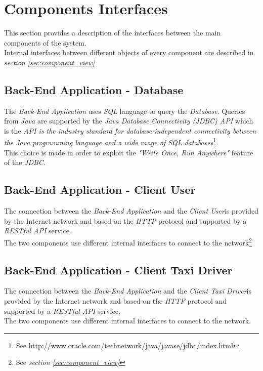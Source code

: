 \section{Components Interfaces} %
\label{sec:components_interfaces}
This section provides a description of the interfaces between the main components of the system.\\
Internal interfaces between different objects of every component are described in \emph{section \ref{sec:component_view}}
\subsection{Back-End Application - Database} %
\label{sub:back_end_application_database}
The \emph{Back-End Application} uses \emph{SQL} language to query the \emph{Database}. Queries from \emph{Java} are supported by the \emph{Java Database Connectivity (JDBC) API} which is the \emph{API is the industry standard for database-independent connectivity between the Java programming language and a wide range of SQL databases}\footnote{See \url{http://www.oracle.com/technetwork/java/javase/jdbc/index.html}}.\\
This choice is made in order to exploit the \emph{"Write Once, Run Anywhere"} feature of the \emph{JDBC}.
\subsection{Back-End Application - Client User} %
\label{sub:back_end_application_client_user}
The connection between the \emph{Back-End Application} and the \emph{Client User}is provided by the Internet network and based on the \emph{HTTP} protocol and supported by a \emph{RESTful API} service.\\
The two components use different internal interfaces to connect to the network\footnote{See \emph{section \ref{sec:component_view}}}
\subsection{Back-End Application - Client Taxi Driver} %
\label{sub:back_end_application_client_taxi}
The connection between the \emph{Back-End Application} and the \emph{Client Taxi Driver}is provided by the Internet network and based on the \emph{HTTP} protocol and supported by a \emph{RESTful API} service.\\
The two components use different internal interfaces to connect to the network.

